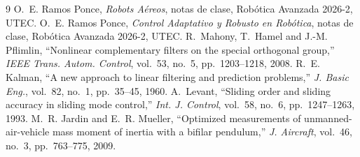








\begin{thebibliography}{9}
 O.~E. Ramos Ponce, \emph{Robots Aéreos}, notas de clase, Robótica Avanzada 2026-2, UTEC.
 O.~E. Ramos Ponce, \emph{Control Adaptativo y Robusto en Robótica}, notas de clase, Robótica Avanzada 2026-2, UTEC.
 R.~Mahony, T.~Hamel and J.-M. Pflimlin, ``Nonlinear complementary filters on the special orthogonal group,'' \emph{IEEE Trans. Autom. Control}, vol.~53, no.~5, pp.~1203--1218, 2008.
 R.~E. Kalman, ``A new approach to linear filtering and prediction problems,'' \emph{J. Basic Eng.}, vol.~82, no.~1, pp.~35--45, 1960.
 A.~Levant, ``Sliding order and sliding accuracy in sliding mode control,'' \emph{Int. J. Control}, vol.~58, no.~6, pp.~1247--1263, 1993.
 M.~R. Jardin and E.~R. Mueller, ``Optimized measurements of unmanned-air-vehicle mass moment of inertia with a bifilar pendulum,'' \emph{J. Aircraft}, vol.~46, no.~3, pp.~763--775, 2009.
\end{thebibliography}

\clearpage
\onecolumn
    


